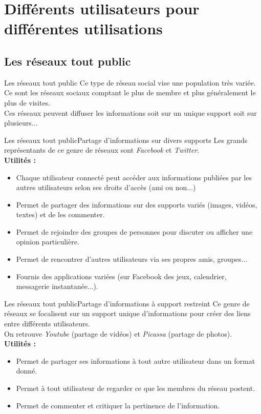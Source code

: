 \documentclass{beamer}
\begin{document}
\section{Différents utilisateurs pour différentes utilisations}

\subsection{Les réseaux tout public}
\begin{frame}{Les réseaux tout public}
	Ce type de réseau social vise une population très variée. \\
	Ce sont les réseaux sociaux comptant le plus de membre et plus généralement le plus de visites.\\
	Ces réseaux peuvent diffuser les informations soit sur un unique support soit sur plusieurs...
\end{frame}

\begin{frame}{Les réseaux tout public}{Partage d'informations sur divers supports}
	Les grands représentants de ce genre de réseaux sont \textit{Facebook} et \textit{Twitter}.
	\\\textbf{Utilités : }
	\begin{itemize}[<+-| alert@+>]
		\item Chaque utilisateur connecté peut accéder aux informations publiées par les autres utilisateurs selon ses droits d'accès (ami ou non...)
		\item Permet de partager des informations sur des supports variés (images, vidéos, textes) et de les commenter.
		\item Permet de rejoindre des groupes de personnes pour discuter ou afficher une opinion particulière.
		\item Permet de rencontrer d'autres utilisateurs via ses propres amis, groupes...
		\item Fournis des applications variées (sur Facebook des jeux, calendrier, messagerie instantanée...).
	\end{itemize}
\end{frame}

\begin{frame}{Les réseaux tout public}{Partage d'informations à support restreint}
	Ce genre de réseaux se focalisent sur un support unique d'informations pour créer des liens entre différents utilisateurs.\\
	On retrouve \textit{Youtube} (partage de vidéos) et \textit{Picassa} (partage de photos).\\
	\textbf{Utilités : }
	\begin{itemize}[<+-| alert@+>]
		\item Permet de partager ses informations à tout autre utilisateur dans un format donné.
		\item Permet à tout utilisateur de regarder ce que les membres du réseau postent.
		\item Permet de commenter et critiquer la pertinence de l'information.
	\end{itemize}
\end{frame}
\end{document}
